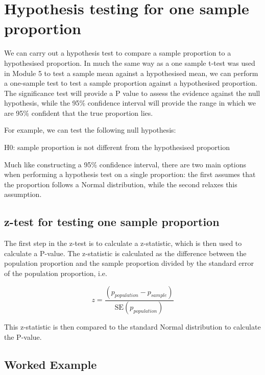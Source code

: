 \documentclass[
]{memoir}
\begin{document}
\hypertarget{hypothesis-testing-for-one-sample-proportion}{%
\section{Hypothesis testing for one sample proportion}\label{hypothesis-testing-for-one-sample-proportion}}

We can carry out a hypothesis test to compare a sample proportion to a hypothesised proportion. In much the same way as a one sample t-test was used in Module 5 to test a sample mean against a hypothesised mean, we can perform a one-sample test to test a sample proportion against a hypothesised proportion. The significance test will provide a P value to assess the evidence against the null hypothesis, while the 95\% confidence interval will provide the range in which we are 95\% confident that the true proportion lies.

For example, we can test the following null hypothesis:

H0: sample proportion is not different from the hypothesised proportion

Much like constructing a 95\% confidence interval, there are two main options when performing a hypothesis test on a single proportion: the first assumes that the proportion follows a Normal distribution, while the second relaxes this assumption.

\hypertarget{z-test-for-testing-one-sample-proportion}{%
\subsection{z-test for testing one sample proportion}\label{z-test-for-testing-one-sample-proportion}}

The first step in the z-test is to calculate a z-statistic, which is then used to calculate a P-value. The z-statistic is calculated as the difference between the population proportion and the sample proportion divided by the standard error of the population proportion, i.e.

\[
z = \frac{(p_{population} - p_{sample})}{\text{SE}(p_{population})}
\]

This z-statistic is then compared to the standard Normal distribution to calculate the P-value.

\hypertarget{worked-example-2}{%
\subsection{Worked Example}\label{worked-example-2}}
\end{document}
